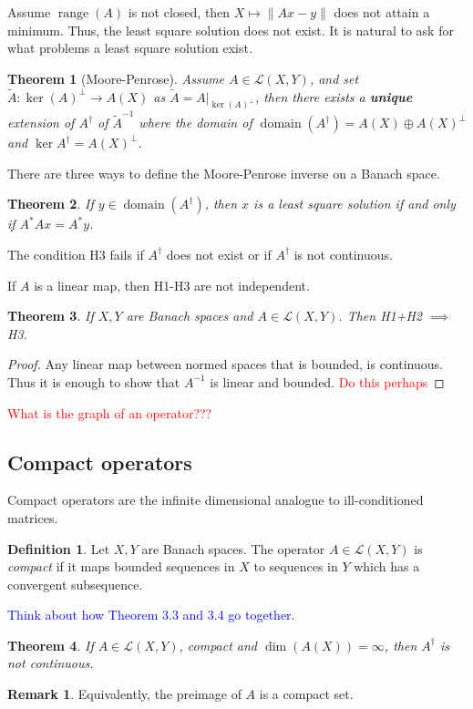 \documentclass[12pt]{article}
\newtheorem{theorem}{Theorem}[section]
\theoremstyle{definition}
\newtheorem{definition}{Definition}[section]
\newtheorem*{remark}{Remark}
\DeclareMathOperator{\range}{range}
\DeclareMathOperator{\domain}{domain}
\newcommand\norm[1]{\left\lVert#1\right\rVert}
\begin{document}
Assume $\range(A)$ is not closed, then $X\mapsto \norm{Ax-y}$ does not attain a minimum. Thus, the least square solution does not exist.  It is natural to ask for what problems a least square solution exist.

\begin{theorem}[Moore-Penrose]
    Assume $A\in \mathcal{L}(X,Y)$, and set $\tilde{A}:\ker(A)^\perp \to A(X)$ as $\tilde{A}=A\Big|_{\ker(A)^\perp}$, then there exists a \textbf{unique} extension of $A^\dagger $ of $\tilde{A}^{-1}$ where the domain of $\domain(A^\dagger )=A(X)\oplus A(X)^\perp$ and $\ker A^\dagger  = A(X)^\perp$.
\end{theorem}

There are three ways to define the Moore-Penrose inverse on a Banach space.

\begin{theorem}
    If $y\in\domain(A^\dagger )$, then $x$ is a least square solution if and only if $A^*Ax=A^*y$.
\end{theorem}

The condition H3 fails if $A^\dagger $ does not exist or if $A^\dagger $ is not continuous.

If $A$ is a linear map, then H1-H3 are not independent. 
\begin{theorem}
    If $X,Y$ are Banach spaces and $A\in\mathcal{L}(X,Y)$. Then H1+H2 $\implies$ H3.
\end{theorem}
\begin{proof}
    Any linear map between normed spaces that is bounded, is continuous. Thus it is enough to show that $A^{-1}$ is linear and bounded. \textcolor{red}{Do this perhaps}
\end{proof}
\textcolor{red}{What is the graph of an operator???}

\subsection{Compact operators}
Compact operators are the infinite dimensional analogue to ill-conditioned matrices.

\begin{definition}
    Let $X,Y$ are Banach spaces. The operator $A\in\mathcal{L}(X,Y)$ is \textit{compact} if it maps bounded sequences in $X$ to sequences in $Y$ which has a convergent subsequence.
\end{definition}

\textcolor{blue}{Think about how Theorem 3.3 and 3.4 go together.}

\begin{theorem}
    If $A\in \mathcal{L}(X,Y)$, compact and $\dim(A(X))=\infty$, then $A^\dagger $ is not continuous.
\end{theorem}
\begin{remark}
    Equivalently, the preimage of $A$ is a compact set.
\end{remark}
\end{document}
